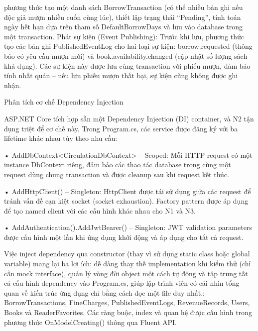 phương thức tạo một danh sách BorrowTransaction (có thể nhiều bản ghi nếu độc giả mượn nhiều cuốn cùng lúc), thiết lập trạng thái “Pending”, tính toán ngày hết hạn dựa trên tham số DefaultBorrowDays và lưu vào database trong một transaction. Phát sự kiện (Event Publishing): Trước khi lưu, phương thức tạo các bản ghi PublishedEventLog cho hai loại sự kiện: borrow.requested (thông báo có yêu cầu mượn mới) và book.availability.changed (cập nhật số lượng sách khả dụng). Các sự kiện này được lưu cùng transaction với phiếu mượn, đảm bảo tính nhất quán – nếu lưu phiếu mượn thất bại, sự kiện cũng không được ghi nhận.

Phân tích cơ chế Dependency Injection

ASP.NET Core tích hợp sẵn một Dependency Injection (DI) container, và N2 tận dụng triệt để cơ chế này. Trong Program.cs, các service được đăng ký với ba lifetime khác nhau tùy theo nhu cầu:

• AddDbContext<CirculationDbContext> – Scoped: Mỗi HTTP request có một instance DbContext riêng, đảm bảo các thao tác database trong cùng một request dùng chung transaction và được cleanup sau khi request kết thúc.

• AddHttpClient() – Singleton: HttpClient được tái sử dụng giữa các request để tránh vấn đề cạn kiệt socket (socket exhaustion). Factory pattern được áp dụng để tạo named client với các cấu hình khác nhau cho N1 và N3.

• AddAuthentication().AddJwtBearer() – Singleton: JWT validation parameters được cấu hình một lần khi ứng dụng khởi động và áp dụng cho tất cả request.

Việc inject dependency qua constructor (thay vì sử dụng static class hoặc global variable) mang lại ba lợi ích: dễ dàng thay thế implementation khi kiểm thử (chỉ cần mock interface), quản lý vòng đời object một cách tự động và tập trung tất cả cấu hình dependency vào Program.cs, giúp lập trình viên có cái nhìn tổng quan về kiến trúc ứng dụng chỉ bằng cách đọc một file duy nhất.: BorrowTransactions, FineCharges, PublishedEventLogs, RevenueRecords, Users, Books và ReaderFavorites. Các ràng buộc, index và quan hệ được cấu hình trong phương thức OnModelCreating() thông qua Fluent API.

\clearpage
